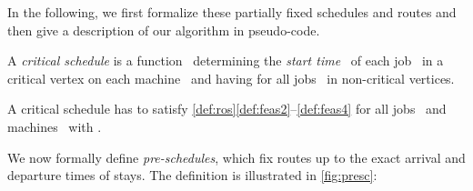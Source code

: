 \documentclass[natbib,sort,smallextended,envcountsame,envcountsect,numbook]{svjour3}
\begin{document}
In the following, we first formalize
these partially fixed schedules and routes
and then give a description of our algorithm in pseudo-code.

\begin{definition}
  A \emph{critical schedule} is a
  function~
  determining the \emph{start time}~
  of each job~ in a critical vertex on each machine~
  and having  for all jobs~ in non-critical vertices.

  A critical schedule has to satisfy \cref{def:ros}\eqref{def:feas2}--\eqref{def:feas4}
  for all jobs~ and machines~ with .
\end{definition}

\noindent
We now formally define \emph{pre-schedules},
which fix routes up to the exact arrival and departure times of stays.
The definition is illustrated in \cref{fig:presc}:
\end{document}
